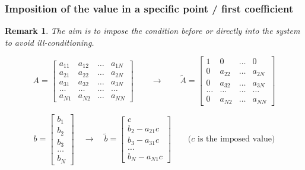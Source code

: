 \documentclass[9pt]{beamer}
\newtheorem*{remark}{Remark}
\begin{document}
\begin{frame}
\frametitle{Imposition of the value in a specific point / first coefficient}
\begin{remark}
	The aim is to impose the condition before or directly into the system to avoid ill-conditioning.
\end{remark}

\begin{equation*}
A=\begin{bmatrix}
a_{11} & a_{12} & \dots & a_{1N} \\ 
a_{21} & a_{22} & \dots & a_{2N} \\ 
a_{31} &a_{32} & \dots & a_{3N} \\
\dots & \dots & \dots & \dots \\
a_{N1}  & a_{N2} & \dots & a_{NN}
\end{bmatrix} \quad \quad \rightarrow
\quad \quad \tilde{A}=\begin{bmatrix}
1 & 0 & \dots & 0 \\ 
0 & a_{22} & \dots & a_{2N} \\ 
0 &a_{32} & \dots & a_{3N} \\
\dots & \dots & \dots & \dots \\
0  & a_{N2} & \dots & a_{NN}
\end{bmatrix}
\end{equation*}

\begin{equation*}
b=\begin{bmatrix}
b_1 \\ b_2 \\ b_3 \\ \dots \\ b_N
\end{bmatrix} \quad \rightarrow \quad
\tilde{b}=\begin{bmatrix}
c \\ b_2 -a_{21}c \\ b_3-a_{31}c \\ \dots \\ b_N-a_{N1}c
\end{bmatrix}
\quad \quad \text{($c$ is the imposed value)}
\end{equation*}
\end{frame}
\end{document}

